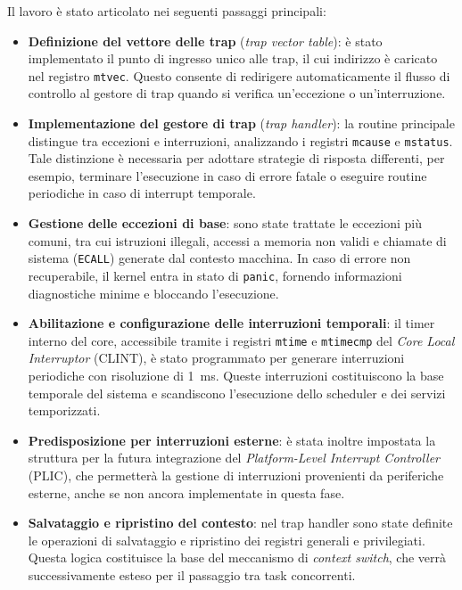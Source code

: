 \documentclass[italian, Lau, oneside]{sapthesis} %
\begin{document}
Il lavoro è stato articolato nei seguenti passaggi principali:
\begin{itemize}
    \item \textbf{Definizione del vettore delle trap} (\textit{trap vector table}): è stato implementato il punto di ingresso unico alle trap, il cui indirizzo è caricato nel registro \texttt{mtvec}.  
    Questo consente di redirigere automaticamente il flusso di controllo al gestore di trap quando si verifica un’eccezione o un’interruzione.

    \item \textbf{Implementazione del gestore di trap} (\textit{trap handler}): la routine principale distingue tra eccezioni e interruzioni, analizzando i registri \texttt{mcause} e \texttt{mstatus}.  
    Tale distinzione è necessaria per adottare strategie di risposta differenti, per esempio, terminare l’esecuzione in caso di errore fatale o eseguire routine periodiche in caso di interrupt temporale.

    \item \textbf{Gestione delle eccezioni di base}: sono state trattate le eccezioni più comuni, tra cui istruzioni illegali, accessi a memoria non validi e chiamate di sistema (\texttt{ECALL}) generate dal contesto macchina.  
    In caso di errore non recuperabile, il kernel entra in stato di \texttt{panic}, fornendo informazioni diagnostiche minime e bloccando l’esecuzione.

    \item \textbf{Abilitazione e configurazione delle interruzioni temporali}: il timer interno del core, accessibile tramite i registri \texttt{mtime} e \texttt{mtimecmp} del \emph{Core Local Interruptor} (CLINT), è stato programmato per generare interruzioni periodiche con risoluzione di 1~ms.  
    Queste interruzioni costituiscono la base temporale del sistema e scandiscono l’esecuzione dello scheduler e dei servizi temporizzati.

    \item \textbf{Predisposizione per interruzioni esterne}: è stata inoltre impostata la struttura per la futura integrazione del \emph{Platform-Level Interrupt Controller} (PLIC), che permetterà la gestione di interruzioni provenienti da periferiche esterne, anche se non ancora implementate in questa fase.

    \item \textbf{Salvataggio e ripristino del contesto}: nel trap handler sono state definite le operazioni di salvataggio e ripristino dei registri generali e privilegiati.  
    Questa logica costituisce la base del meccanismo di \textit{context switch}, che verrà successivamente esteso per il passaggio tra task concorrenti.
\end{itemize}
\end{document}
